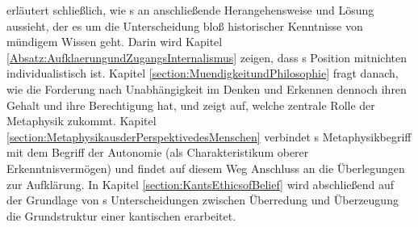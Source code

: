 erläutert schließlich, wie s an
 anschließende
Herangehensweise und Lösung aussieht, der es um die Unterscheidung bloß
historischer Kenntnisse von mündigem Wissen geht. Darin wird Kapitel
\ref{Absatz:AufklaerungundZugangsInternalismus} zeigen, dass
s Position mitnichten individualistisch ist.
Kapitel \ref{section:MuendigkeitundPhilosophie} fragt danach, wie die Forderung
nach Unabhängigkeit im Denken und Erkennen dennoch ihren Gehalt und ihre
Berechtigung hat, und zeigt auf, welche zentrale Rolle der Metaphysik
zukommt. Kapitel \ref{section:MetaphysikausderPerspektivedesMenschen} verbindet
s Metaphysikbegriff mit dem Begriff der Autonomie
(als Charakteristikum oberer Erkenntnisvermögen) und findet auf diesem
Weg Anschluss an die Überlegungen zur
Aufklärung. In Kapitel \ref{section:KantsEthicsofBelief} wird
abschließend auf der Grundlage von s
Unterscheidungen zwischen Überredung und Überzeugung die Grundstruktur
einer kantischen  erarbeitet. 



